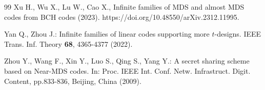 \documentclass[sn-mathphys-num]{sn-jnl}%
\theoremstyle{thmstyleone}%
\theoremstyle{thmstyletwo}%
\theoremstyle{thmstylethree}%
\begin{document}
\begin{thebibliography}{99}
	 Xu H., Wu X., Lu W., Cao X., Infinite families of MDS and almost MDS codes from BCH codes (2023). https://doi.org/10.48550/arXiv.2312.11995.
	
	 Yan Q., Zhou J.: Infinite families of linear codes supporting more $t$-designs. IEEE Trans. Inf. Theory \textbf{68}, 4365-4377 (2022).
	
	 Zhou Y., Wang F., Xin Y., Luo S., Qing S., Yang Y.: A secret sharing scheme based on Near-MDS codes. In: Proc. IEEE Int. Conf. Netw. Infrastruct. Digit. Content, pp.833-836, Beijing, China (2009).
	
\end{thebibliography}
\end{document}
